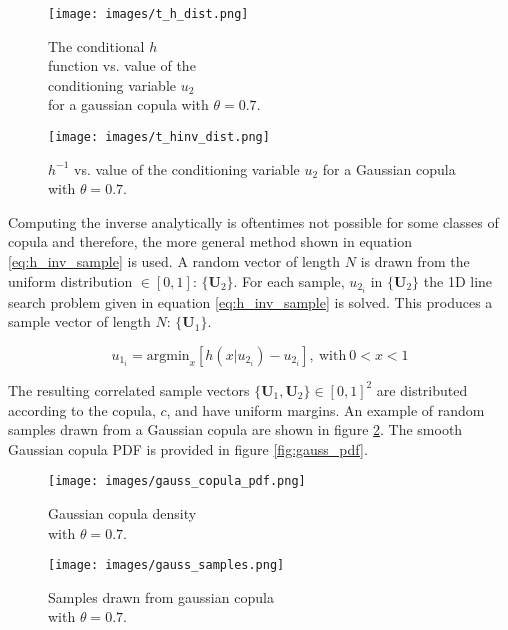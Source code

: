 \begin{figure}[!htbp]
\centering
\begin{minipage}{.45\textwidth}
  \texttt{[image: images/t\_h\_dist.png]}
\caption{The conditional $h$ \\ function vs. value of the \\ conditioning variable $u_2$ \\ for a gaussian copula with $\theta=0.7$.}
\label{fig:gauss_h}
\end{minipage}%
\begin{minipage}{.45\textwidth}
  \texttt{[image: images/t\_hinv\_dist.png]}
\caption{$h^{-1}$ vs. value of the conditioning variable $u_2$ for a Gaussian copula with $\theta=0.7$.\\}
\label{fig:gauss_hinv}
\end{minipage}
\end{figure}

Computing the inverse analytically is oftentimes not possible for some classes of copula and therefore, the more general method shown in equation \ref{eq:h_inv_sample} is used.
A random vector of length $N$ is drawn from the uniform distribution $\in [0, 1]$:  $\{\mathbf U_2\}$.  For each sample, $u_{2_i}$ in $\{\mathbf U_2\}$ the 1D line search problem given in equation \ref{eq:h_inv_sample} is solved.  This produces a sample vector of length $N$: $\{\mathbf U_1\}$.

\begin{equation}
u_{1_i} = \mathrm{argmin}_{x} \left[ h(x|u_{2_i}) - u_{2_i} \right],\ \mathrm{with}\ 0 < x < 1
\label{eq:h_inv_sample}
\end{equation}

The resulting correlated sample vectors $\{\mathbf U_1, \mathbf U_2\} \in [0,1]^2$ are distributed according to the copula, $c$, and have uniform margins.  An example of random samples drawn from a Gaussian copula are shown in figure \ref{fig:gauss_samples}.  The smooth Gaussian copula PDF is provided in figure \ref{fig:gauss_pdf}.

\begin{figure}[!htbp]
\centering
\begin{minipage}{.45\textwidth}
  \texttt{[image: images/gauss\_copula\_pdf.png]}
\caption{Gaussian copula density\\ with $\theta=0.7$.}
\label{fig:gauss_pdf}
\end{minipage}%
\begin{minipage}{.45\textwidth}
  \texttt{[image: images/gauss\_samples.png]}
\caption{Samples drawn from gaussian copula\\ with $\theta=0.7$.}
\label{fig:gauss_samples}
\end{minipage}
\end{figure}

